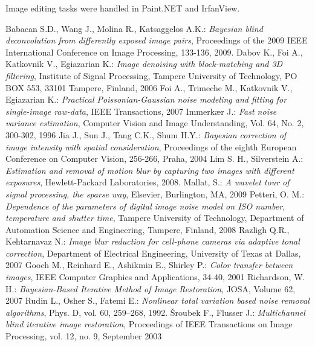\documentclass[12pt,notitlepage]{report}
\begin{document}
Image editing tasks were handled in Paint.NET and IrfanView.


\begin{thebibliography}{xxxxx-99}
  Babacan S.D., Wang J., Molina R., Katsaggelos A.K.: {\em Bayesian blind deconvolution from differently exposed image pairs}, Proceedings of the 2009 IEEE International Conference on Image Processing, 133-136, 2009.
  Dabov K., Foi A., Katkovnik V., Egiazarian K.: {\em Image denoising with block-matching and 3D filtering}, Institute of Signal Processing, Tampere University of Technology, PO BOX 553, 33101 Tampere, Finland, 2006
 Foi A., Trimeche M., Katkovnik V., Egiazarian K.: {\em Practical Poissonian-Gaussian noise modeling and fitting for single-image raw-data}, IEEE Transactions, 2007
  Immerkær J.: {\em Fast noise variance estimation}, Computer Vision and Image Understanding, Vol. 64, No. 2, 300-302, 1996
 Jia J., Sun J., Tang C.K., Shum H.Y.: {\em Bayesian correction of image intensity with spatial consideration}, Proceedings of the eighth European Conference on Computer Vision, 256-266, Praha, 2004
  Lim S. H., Silverstein A.: {\em Estimation and removal of motion blur by capturing two images with different exposures}, Hewlett-Packard Laboratories, 2008. 
 Mallat, S.: {\em A wavelet tour of signal processing, the sparse way}, Elsevier, Burlington, MA, 2009
 Petteri, O. M.: {\em Dependence of the parameters of digital image noise model on ISO number, temperature and shutter time}, Tampere University of Technology, Department of Automation Science and Engineering, Tampere, Finland, 2008
 Razligh Q.R., Kehtarnavaz N.: {\em Image blur reduction for cell-phone cameras via adaptive tonal correction}, Department of Electrical Engineering, University of Texas at Dallas, 2007
 Gooch M., Reinhard E., Ashikmin E., Shirley P.: {\em Color transfer between images}, IEEE Computer Graphics and Applications, 34-40, 2001
 Richardson, W. H.: {\em Bayesian-Based Iterative Method of Image Restoration}, JOSA, Volume 62, 2007
  Rudin L., Osher S., Fatemi E.: {\em Nonlinear total variation based noise removal algorithms}, Phys. D, vol. 60, 259–268, 1992.
 Šroubek F., Flusser J.: {\em Multichannel blind iterative image restoration}, Proceedings of IEEE Transactions on Image Processing, vol. 12, no. 9, September 2003

\end{thebibliography}
\end{document}

